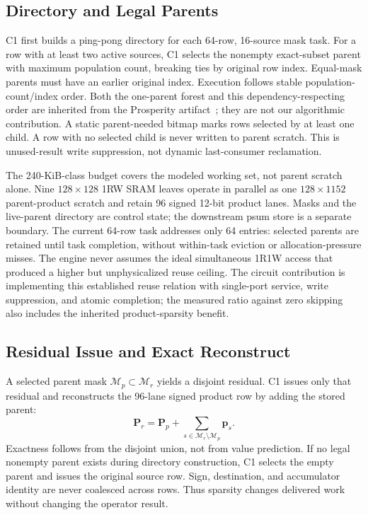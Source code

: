 \documentclass[journal]{IEEEtran}
\begin{document}
\subsection{Directory and Legal Parents}
C1 first builds a ping-pong directory for each 64-row, 16-source mask task.
For a row with at least two active sources, C1 selects the nonempty
exact-subset parent with maximum population
count, breaking ties by original row index.  Equal-mask parents must have
an earlier original index.  Execution follows stable population-count/index
order.  Both the one-parent forest and this dependency-respecting order are
inherited from the Prosperity artifact~\cite{prosperity}; they are not our
algorithmic contribution.  A static parent-needed bitmap marks rows selected
by at least one child.  A row with no selected child is never written to
parent scratch.  This is unused-result write suppression, not dynamic
last-consumer reclamation.

The 240-KiB-class budget covers the modeled working set, not parent scratch
alone.  Nine $128\times128$ 1RW SRAM leaves operate in
parallel as one $128\times1152$ parent-product scratch and retain 96 signed
12-bit product lanes.  Masks and the live-parent directory are control state;
the downstream psum store is a separate boundary.  The current 64-row task
addresses only 64 entries: selected parents are retained until task completion,
without within-task eviction or allocation-pressure misses.  The engine never assumes
the ideal simultaneous 1R1W access that produced a higher but unphysicalized
reuse ceiling.  The circuit contribution is implementing this established
reuse relation with single-port service, write suppression, and atomic
completion; the measured ratio against zero skipping also includes the
inherited product-sparsity benefit.

\subsection{Residual Issue and Exact Reconstruct}
A selected parent mask $\mathcal{M}_p\subset\mathcal{M}_r$ yields a disjoint
residual.  C1 issues only that residual and reconstructs the 96-lane signed
product row by adding the stored parent:
\begin{equation}
\mathbf{P}_r=\mathbf{P}_p+
\sum_{s\in\mathcal{M}_r\setminus\mathcal{M}_p}\mathbf{p}_s.
\label{eq:c1exact}
\end{equation}
Exactness follows from the disjoint union, not from value prediction.  If no
legal nonempty parent exists during directory construction, C1 selects the empty parent and issues the
original source row.  Sign, destination, and accumulator identity are never
coalesced across rows.  Thus sparsity changes delivered work without changing
the operator result.
\end{document}
